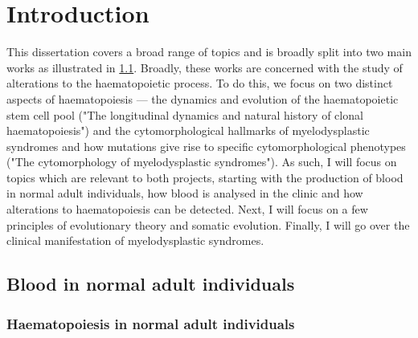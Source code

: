 \chapter{Introduction}

This dissertation covers a broad range of topics and is broadly split into two main works as illustrated in \ref{fig:overview}. Broadly, these works are concerned with the study of alterations to the haematopoietic process. To do this, we focus on two distinct aspects of haematopoiesis --- the dynamics and evolution of the haematopoietic stem cell pool ("The longitudinal dynamics and natural history of clonal haematopoiesis") and the cytomorphological hallmarks of myelodysplastic syndromes and how mutations give rise to specific cytomorphological phenotypes ("The cytomorphology of myelodysplastic syndromes"). As such, I will focus on topics which are relevant to both projects, starting with the production of blood in normal adult individuals, how blood is analysed in the clinic and how alterations to haematopoiesis can be detected. Next, I will focus on a few principles of evolutionary theory and somatic evolution. Finally, I will go over the clinical manifestation of myelodysplastic syndromes.

\begin{figure}
  \label{fig:overview}
\end{figure}

\section{Blood in normal adult individuals}

\subsection{Haematopoiesis in normal adult individuals}


